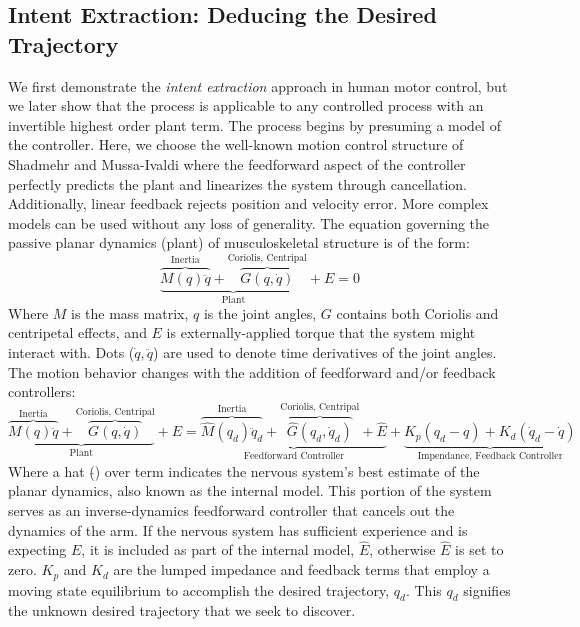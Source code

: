 \documentclass[10pt]{article}
\begin{document}
\subsection*{Intent Extraction: Deducing the Desired Trajectory}
We first demonstrate the \textit{intent extraction} approach in human motor control, but we later show that the process is applicable to any controlled process with an invertible highest order plant term. The process begins by presuming a model of the controller. Here, we choose the well-known motion control structure of Shadmehr and Mussa-Ivaldi\cite{shadmehr1994adaptive} where the feedforward aspect of the controller perfectly predicts the plant and linearizes the system through cancellation. Additionally, linear feedback rejects position and velocity error. More complex models can be used without any loss of generality. The equation governing the passive planar dynamics (plant) of musculoskeletal structure is of the form:
\begin{equation}
\underbrace{\overbrace{M(q)\ddot{q}}^{\text{Inertia}}+\overbrace{G(q,\dot{q})}^{\text{Coriolis, Centripal}}}_{\text{Plant}}+E=0
\end{equation}
Where $M$ is the mass matrix, $q$ is the joint angles, $G$ contains both Coriolis and centripetal effects, and $E$ is externally-applied torque that the system might interact with. Dots ($\dot{q}, \ddot{q}$) are used to denote time derivatives of the joint angles. The motion behavior changes with the addition of feedforward and/or feedback controllers:
\begin{equation}
\underbrace{\overbrace{M(q)\ddot{q}}^{\text{Inertia}}+\overbrace{G(q,\dot{q})}^{\text{Coriolis, Centripal}}}_{\text{Plant}}+E=\underbrace{\overbrace{\hat{M}(q_d)\ddot{q}_d}^{\text{Inertia}}+\overbrace{\hat{G}(q_d,\dot{q}_d)}^{\text{Coriolis, Centripal}}+\hat{E}}_{\text{Feedforward Controller}}+\underbrace{K_p(q_d-q)+K_d(\dot{q}_d-\dot{q})}_{\text{Impendance, Feedback Controller}}
\end{equation}
Where a hat ($\hat{ }$) over term indicates the nervous system's best estimate of the planar dynamics, also known as the internal model. This portion of the system serves as an inverse-dynamics feedforward controller that cancels out the dynamics of the arm. If the nervous system has sufficient experience and is expecting $E$, it is included as part of the internal model, $\hat{E}$, otherwise $\hat{E}$ is set to zero. $K_p$ and $K_d$ are the lumped impedance and feedback terms that employ a moving state equilibrium to accomplish the desired trajectory, $q_d$. This $q_d$ signifies the unknown desired trajectory that we seek to discover.
\end{document}
